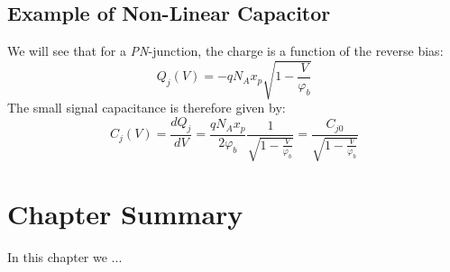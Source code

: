 \subsection{Example of Non-Linear Capacitor}
We will see that for a \emph{PN}-junction, the charge is a function of the reverse bias:
    \begin{equation} 
        {Q_j}(V) =  - q{N_A}{x_p}\sqrt {1 - \frac{V}{{{\varphi _b}}}} 
    \end{equation}
The small signal capacitance is therefore given by:
    \begin{equation} 
        {C_j}(V) = \frac{{dQ_j^{}}}{{dV}} = \frac{{q{N_A}{x_p}}}{{2{\varphi _b}}}\frac{1}{{\sqrt {1 - \frac{V}{{{\varphi _b}}}}}} = \frac{{C_{j0}^{}}}{{\sqrt {1 - \frac{V}{{{\varphi _b}}}}}} 
    \end{equation}
\newpage
\section{Chapter Summary}
In this chapter we ...
